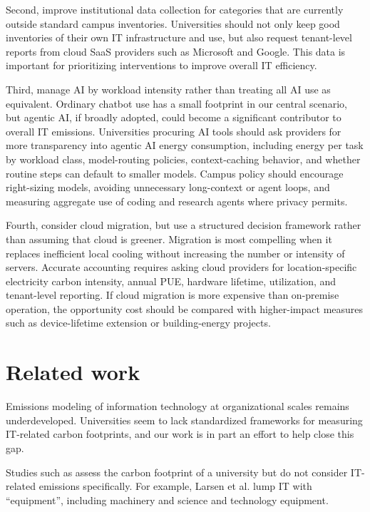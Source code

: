 \documentclass[11pt]{article}
\begin{document}
Second, improve institutional data collection for categories that are currently
outside standard campus inventories. Universities should not only keep good
inventories of their own IT infrastructure and use, but also request
tenant-level reports from cloud SaaS providers such as Microsoft and Google.
This data is important for prioritizing interventions to improve overall IT
efficiency.

Third, manage AI by workload intensity rather than treating all AI use as
equivalent. Ordinary chatbot use has a small footprint in our central scenario, but agentic AI,
if broadly adopted, could become a significant contributor to overall IT
emissions. Universities procuring AI tools should ask providers for more
transparency into agentic AI energy consumption, including energy per task by
workload class, model-routing policies, context-caching behavior,  and whether
routine steps can default to smaller models. Campus policy should encourage
right-sizing models, avoiding unnecessary long-context or agent loops, and
measuring aggregate use of coding and research agents where privacy permits.

Fourth, consider cloud migration, but use a structured decision framework rather
than assuming that cloud is greener. Migration is most compelling when it
replaces inefficient local cooling without increasing the number or intensity of
servers. Accurate accounting requires asking cloud providers for
location-specific electricity carbon intensity, annual PUE, hardware lifetime,
utilization, and tenant-level reporting. If cloud migration is more expensive
than on-premise operation, the opportunity cost should be compared with
higher-impact measures such as device-lifetime extension or building-energy
projects.

\section{Related work}
\label{sec:related:work}

Emissions modeling of information technology at organizational scales remains
underdeveloped. Universities seem to lack standardized frameworks for measuring
IT-related carbon footprints, and our work is in part an effort to help close
this gap.

Studies such as \textcite{larsen:2013} assess the carbon footprint of a
university but do not consider IT-related emissions specifically. For example,
Larsen et al. lump IT with ``equipment'', including machinery and science and
technology equipment.
\end{document}
